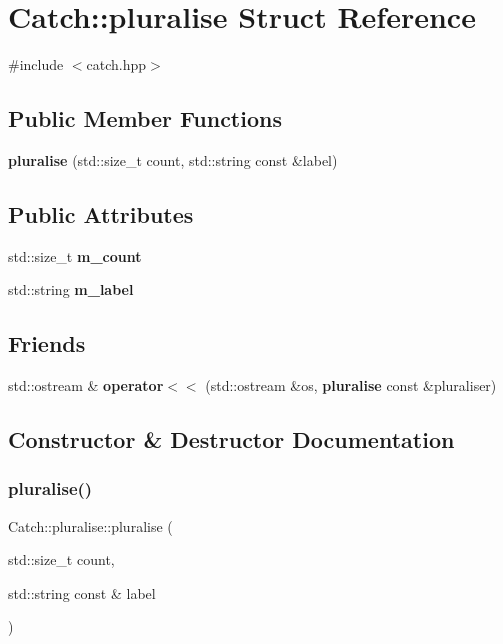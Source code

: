 \section{Catch\+::pluralise Struct Reference}
\label{struct_catch_1_1pluralise}


{\ttfamily \#include $<$catch.\+hpp$>$}

\subsection*{Public Member Functions}
\begin{DoxyCompactItemize}
\item 
\textbf{ pluralise} (std\+::size\+\_\+t count, std\+::string const \&label)
\end{DoxyCompactItemize}
\subsection*{Public Attributes}
\begin{DoxyCompactItemize}
\item 
std\+::size\+\_\+t \textbf{ m\+\_\+count}
\item 
std\+::string \textbf{ m\+\_\+label}
\end{DoxyCompactItemize}
\subsection*{Friends}
\begin{DoxyCompactItemize}
\item 
std\+::ostream \& \textbf{ operator$<$$<$} (std\+::ostream \&os, \textbf{ pluralise} const \&pluraliser)
\end{DoxyCompactItemize}


\subsection{Constructor \& Destructor Documentation}
\mbox{\label{struct_catch_1_1pluralise_a5c55e22de2416cfe416edf715c6b9234}} 
\subsubsection{pluralise()}
{\footnotesize\ttfamily Catch\+::pluralise\+::pluralise (\begin{DoxyParamCaption}\item[{std\+::size\+\_\+t}]{count,  }\item[{std\+::string const \&}]{label }\end{DoxyParamCaption})}



